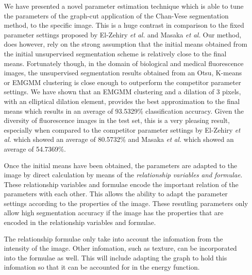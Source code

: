 \documentclass[10pt, journal, letterpaper, onecolumn, draftcls]{IEEEtran}
\begin{document}
We have presented a novel parameter estimation technique which is able to tune the parameters of the graph-cut application of the Chan-Vese segmentation method, to the specific image.
This is a huge contrast in comparison to the fixed parameter settings proposed by El-Zehiry \textit{et al.} %
and Masaka \textit{et al.} %
Our method, does however, rely on the strong assumption that the initial means obtained from the initial unsupervised segmentation scheme is relatively close to the final means. 
Fortunately though, in the domain of biological and medical fluorescence images, the unsupervised segmentation results obtained from an Otsu, K-means or EMGMM clustering is close enough to outperform the competitor parameter settings. We have shown that an EMGMM clustering and a dilation of 3 pixels, with an elliptical dilation element, provides the best approximation to the final means which results in an average of 93.5329\% classification accuracy. Given the diversity of fluorescence images in the test set, this is a very pleasing result, especially when compared to the competitor parameter settings by El-Zehiry \textit{et al.} %
which showed an average of 80.5732\% and Masaka \textit{et al.} %
which showed an average of 54.7369\%.

Once the initial means have been obtained, the parameters are adapted to the image by direct calculation by means of the \textit{relationship variables and formulae}. These relationship variables and formulae encode the important relation of the parameters with each other. This allows the  ability to adapt the parameter settings according to the properties of the image. These resutling parameters only allow high segmentation accuracy if the image has the properties that are encoded in the relationship variables and formulae.

The relationship formulae only take into account the infomation from the intensity of the image. Other infomation, such as texture, can be incorporated into the formulae as well. This will include adapting the graph to hold this infomation so that it can be accounted for in the energy function.
\end{document}
